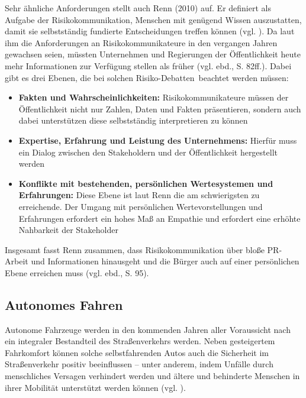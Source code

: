 Sehr ähnliche Anforderungen stellt auch Renn (2010) auf. Er definiert als Aufgabe der Risikokommunikation, Menschen mit genügend Wissen auszustatten, damit sie selbstständig fundierte Entscheidungen treffen können (vgl. \cite[81]{renn2010risk}). Da laut ihm die Anforderungen an Risikokommunikateure in den vergangen Jahren gewachsen seien, müssten Unternehmen und Regierungen der Öffentlichkeit heute mehr Informationen zur Verfügung stellen als früher (vgl. ebd., S. 82ff.). Dabei gibt es drei Ebenen, die bei solchen \glq Risiko-Debatten\grq \, beachtet werden müssen:
\begin{itemize}
  \item \textbf{Fakten und Wahrscheinlichkeiten:} Risikokommunikateure müssen der Öffentlichkeit nicht nur Zahlen, Daten und Fakten präsentieren, sondern auch dabei unterstützen diese selbstständig interpretieren zu können
  \item \textbf{Expertise, Erfahrung und Leistung des Unternehmens:} Hierfür muss ein Dialog zwischen den Stakeholdern und der Öffentlichkeit hergestellt werden
  \item \textbf{Konflikte mit bestehenden, persönlichen Wertesystemen und Erfahrungen:} Diese Ebene ist laut Renn die am schwierigsten zu erreichende. Der Umgang mit persönlichen Wertevorstellungen und Erfahrungen erfordert ein hohes Maß an Empathie und erfordert eine erhöhte Nahbarkeit der Stakeholder
\end{itemize}

Insgesamt fasst Renn zusammen, dass Risikokommunikation über bloße PR-Arbeit und Informationen hinausgeht und die Bürger auch auf einer persönlichen Ebene erreichen muss (vgl. ebd., S. 95).

\subsection{Autonomes Fahren}

Autonome Fahrzeuge werden in den kommenden Jahren aller Voraussicht nach ein integraler Bestandteil des Straßenverkehrs werden. Neben gesteigertem Fahrkomfort können solche selbstfahrenden Autos auch die Sicherheit im Straßenverkehr positiv beeinflussen – unter anderem, indem Unfälle durch menschliches Versagen verhindert werden und ältere und behinderte Menschen in ihrer Mobilität unterstützt werden können (vgl.  \cite[167]{fagnant2015preparing}).

